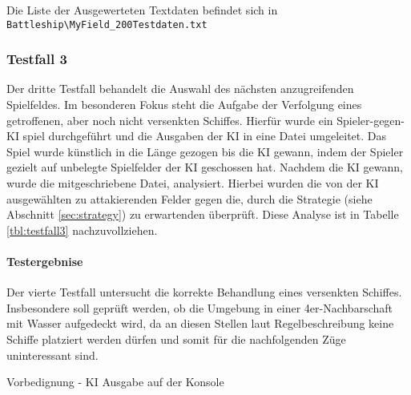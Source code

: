 		Die Liste der Ausgewerteten Textdaten befindet sich in \newline \texttt{Battleship\textbackslash MyField\_200Testdaten.txt}
	\subsubsection{Testfall 3} %
	\label{ssub:testfall_3}
	
	Der dritte Testfall behandelt die Auswahl des nächsten anzugreifenden Spielfeldes. Im besonderen Fokus steht die Aufgabe der Verfolgung eines 
	getroffenen, aber noch nicht versenkten Schiffes.
	Hierfür wurde ein Spieler-gegen-KI spiel durchgeführt und die Ausgaben der KI in eine Datei umgeleitet. Das Spiel wurde künstlich in die Länge 
	gezogen bis die KI gewann, indem der Spieler gezielt auf unbelegte Spielfelder der KI geschossen hat.
	Nachdem die KI gewann, wurde die mitgeschriebene Datei, analysiert. Hierbei wurden die von der KI ausgewählten zu attakierenden Felder gegen die,
	durch die Strategie (siehe Abschnitt \ref{sec:strategy}) zu erwartenden überprüft. Diese Analyse ist in Tabelle \ref{tbl:testfall3} nachzuvollziehen.
	
	
	\paragraph{Testergebnise} %
	\label{par:testergebnise}
	
	Der vierte Testfall untersucht die korrekte Behandlung eines versenkten Schiffes. Insbesondere soll geprüft werden, ob die Umgebung in einer 4er-Nachbarschaft
	mit Wasser aufgedeckt wird, da an diesen Stellen laut Regelbeschreibung keine Schiffe platziert werden dürfen und somit für die nachfolgenden Züge 
	uninteressant sind.
	
	Vorbedignung - KI Ausgabe auf der Konsole
     
